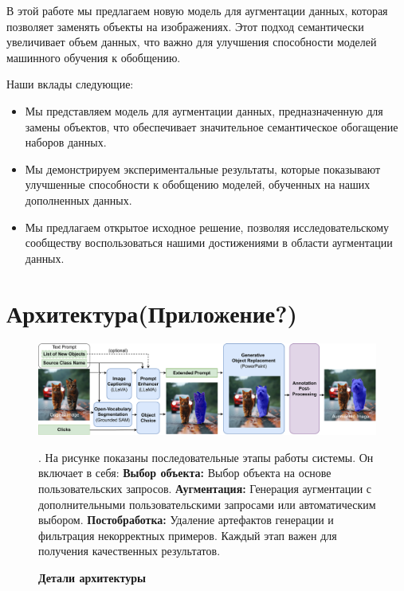 \documentclass[11pt]{article}
\begin{document}
В этой работе мы предлагаем новую модель для аугментации данных, которая позволяет заменять объекты на изображениях. Этот подход семантически увеличивает объем данных, что важно для улучшения способности моделей машинного обучения к обобщению.


Наши вклады следующие:
\begin{itemize}
    \item Мы представляем модель для аугментации данных, предназначенную для замены объектов, что обеспечивает значительное семантическое обогащение наборов данных.
    \item Мы демонстрируем экспериментальные результаты, которые показывают улучшенные способности к обобщению моделей, обученных на наших дополненных данных.
    \item Мы предлагаем открытое исходное решение, позволяя исследовательскому сообществу воспользоваться нашими достижениями в области аугментации данных. 
\end{itemize}

\section{Архитектура(Приложение?)}

\begin{figure}[h]
    \centering
    \includegraphics[width=\textwidth]{figures/scheme_augmented.pdf}
    \caption \textbf{Детали архитектуры}. На рисунке показаны последовательные этапы работы системы. Он включает в себя:
\textbf{Выбор объекта:} Выбор объекта на основе пользовательских запросов.
\textbf{Аугментация:} Генерация аугментации с дополнительными пользовательскими запросами или автоматическим выбором.
\textbf{Постобработка:} Удаление артефактов генерации и фильтрация некорректных примеров. Каждый этап важен для получения качественных результатов.
    \label{fig:internal_framework}
\end{figure}
\end{document}
